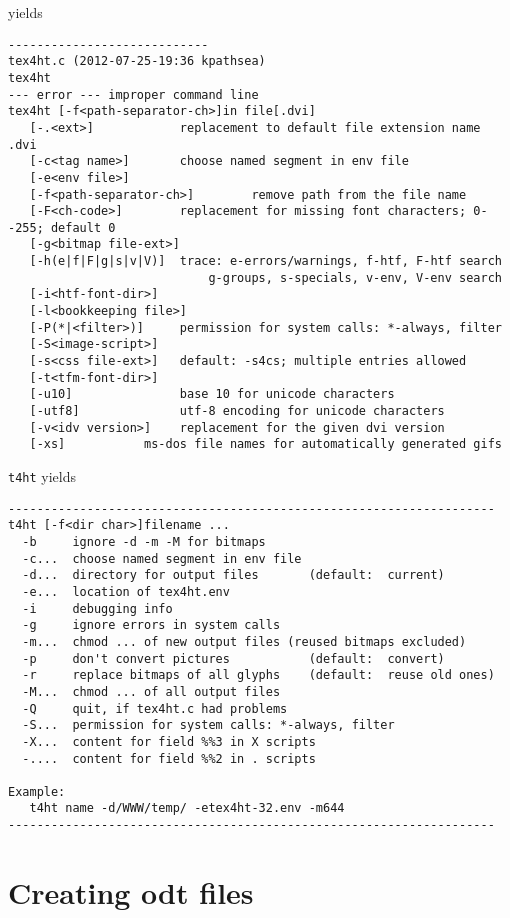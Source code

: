  yields 

\begin{Verbatim}[fontsize=\scriptsize]
----------------------------
tex4ht.c (2012-07-25-19:36 kpathsea)
tex4ht 
--- error --- improper command line
tex4ht [-f<path-separator-ch>]in file[.dvi]
   [-.<ext>]            replacement to default file extension name .dvi
   [-c<tag name>]       choose named segment in env file
   [-e<env file>]
   [-f<path-separator-ch>]        remove path from the file name
   [-F<ch-code>]        replacement for missing font characters; 0--255; default 0
   [-g<bitmap file-ext>]
   [-h(e|f|F|g|s|v|V)]  trace: e-errors/warnings, f-htf, F-htf search
                            g-groups, s-specials, v-env, V-env search
   [-i<htf-font-dir>]
   [-l<bookkeeping file>]
   [-P(*|<filter>)]     permission for system calls: *-always, filter
   [-S<image-script>]
   [-s<css file-ext>]   default: -s4cs; multiple entries allowed
   [-t<tfm-font-dir>]
   [-u10]               base 10 for unicode characters
   [-utf8]              utf-8 encoding for unicode characters
   [-v<idv version>]    replacement for the given dvi version
   [-xs]           ms-dos file names for automatically generated gifs
\end{Verbatim}


\texttt{t4ht} yields 

\begin{Verbatim}[fontsize=\footnotesize]
--------------------------------------------------------------------
t4ht [-f<dir char>]filename ...
  -b     ignore -d -m -M for bitmaps
  -c...  choose named segment in env file
  -d...  directory for output files       (default:  current)
  -e...  location of tex4ht.env
  -i     debugging info
  -g     ignore errors in system calls
  -m...  chmod ... of new output files (reused bitmaps excluded)
  -p     don't convert pictures           (default:  convert)
  -r     replace bitmaps of all glyphs    (default:  reuse old ones)
  -M...  chmod ... of all output files
  -Q     quit, if tex4ht.c had problems
  -S...  permission for system calls: *-always, filter
  -X...  content for field %%3 in X scripts
  -....  content for field %%2 in . scripts

Example: 
   t4ht name -d/WWW/temp/ -etex4ht-32.env -m644
--------------------------------------------------------------------
\end{Verbatim}

\flushbottom

\section{Creating odt files}\label{sec:tex2odt}

